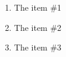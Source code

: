 \documentclass{article}
\makeatletter
\newcommand*{\wackyenum}[1]{%
			\expandafter\@wackyenum\csname c@#1\endcsname%
		}
\newcommand*{\@wackyenum}[1]{%
			$\ifcase#1\or My\,\,own\,\,one \or My\,\,own\,\,two \or My\,\,own\,\,three \or My\,\,own\,\,four%
			\else\@ctrerr\fi$%
		}
\makeatother
\begin{document}
\begin{enumerate}[label=\wackyenum*]
	\item The item \#1
	\item The item \#2
	\item The item \#3
\end{enumerate}
\end{document}
